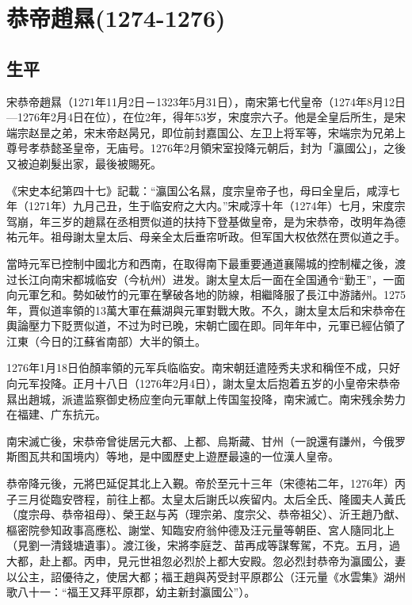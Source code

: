 
\section{恭帝趙㬎\tiny(1274-1276)}

\subsection{生平}

宋恭帝趙㬎（1271年11月2日－1323年5月31日），南宋第七代皇帝（1274年8月12日—1276年2月4日在位），在位2年，得年53岁，宋度宗六子。他是全皇后所生，是宋端宗赵昰之弟，宋末帝赵昺兄，即位前封嘉国公、左卫上将军等，宋端宗为兄弟上尊号孝恭懿圣皇帝，无庙号。1276年2月領宋室投降元朝后，封为「瀛國公」，之後又被迫剃髮出家，最後被賜死。

《宋史本纪第四十七》記載：“瀛国公名㬎，度宗皇帝子也，母曰全皇后，咸淳七年（1271年）九月己丑，生于临安府之大内。”宋咸淳十年（1274年）七月，宋度宗驾崩，年三岁的趙㬎在丞相贾似道的扶持下登基做皇帝，是为宋恭帝，改明年為德祐元年。祖母謝太皇太后、母亲全太后垂帘听政。但军国大权依然在贾似道之手。

當時元军已控制中國北方和西南，在取得南下最重要通道襄陽城的控制權之後，渡过长江向南宋都城临安（今杭州）进发。謝太皇太后一面在全国通令“勤王”，一面向元軍乞和。勢如破竹的元軍在擊破各地的防線，相繼降服了長江中游諸州。1275年，賈似道率領的13萬大軍在蕪湖與元軍對戰大敗。不久，謝太皇太后和宋恭帝在輿論壓力下貶贾似道，不过为时已晚，宋朝亡國在即。同年年中，元軍已經佔領了江東（今日的江蘇省南部）大半的領土。

1276年1月18日伯顏率領的元军兵临临安。南宋朝廷遣陸秀夫求和稱侄不成，只好向元军投降。正月十八日（1276年2月4日），謝太皇太后抱着五岁的小皇帝宋恭帝㬎出趙城，派遣监察御史杨应奎向元軍献上传国玺投降，南宋滅亡。南宋残余势力在福建、广东抗元。

南宋滅亡後，宋恭帝曾徙居元大都、上都、烏斯藏、甘州（一說還有謙州，今俄罗斯图瓦共和国境内）等地，是中國歷史上遊歷最遠的一位漢人皇帝。

恭帝降元後，元將巴延促其北上入覲。帝於至元十三年（宋德祐二年，1276年）丙子三月從臨安啓程，前往上都。太皇太后謝氏以疾留内。太后全氏、隆國夫人黃氏（度宗母、恭帝祖母）、榮王赵与芮（理宗弟、度宗父、恭帝祖父）、沂王趙乃猷、樞密院參知政事高應松、謝堂、知臨安府翁仲德及汪元量等朝臣、宮人隨同北上（見劉一清錢塘遺事）。渡江後，宋將李庭芝、苗再成等謀奪駕，不克。五月，過大都，赴上都。丙申，見元世祖忽必烈於上都大安殿。忽必烈封恭帝为瀛國公，妻以公主，詔優待之，使居大都；福王趙與芮受封平原郡公（汪元量《水雲集》湖州歌八十一：“福王又拜平原郡，幼主新封瀛國公”）。

